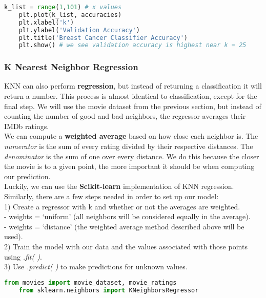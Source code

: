 \documentclass[11pt, a4paper]{article}
\begin{document}
\begin{spacing}{1.1}
\begin{lstlisting}[language=Python]
	k_list = range(1,101) # x values
	plt.plot(k_list, accuracies)
	plt.xlabel('k')
	plt.ylabel('Validation Accuracy')
	plt.title('Breast Cancer Classifier Accuracy')
	plt.show() # we see validation accuracy is highest near k = 25	\end{lstlisting} \newpage

	\subsubsection{K Nearest Neighbor Regression}
	KNN can also perform \textbf{regression}, but instead of returning a classification it will return a number. This process is almost identical to classification, except for the final step. We will use the movie dataset from the previous section, but instead of counting the number of good and bad neighbors, the regressor averages their IMDb ratings. \vspace*{2mm} \\
	We can compute a \textbf{weighted average} based on how close each neighbor is. The \textit{numerator} is the sum of every rating divided by their respective distances. The \textit{denominator} is the sum of one over every distance. We do this because the closer the movie is to a given point, the more important it should be when computing our prediction. \vspace*{2mm} \\
	Luckily, we can use the \textbf{Scikit-learn} implementation of KNN regression. Similarly, there are a few steps needed in order to set up our model: \\
	\hspace*{3mm} 1) Create a regressor with k and whether or not the averages are weighted. \\
	\hspace*{7mm} - weights = `uniform' (all neighbors will be considered equally in the average). \\
	\hspace*{7mm} - weights = `distance' (the weighted average method described above will be used). \\
	\hspace*{3mm} 2) Train the model  with our data and the values associated with those points using \textit{.fit( )}. \\
	\hspace*{3mm} 3) Use \textit{.predict( )} to make predictions for unknown values.	
	\begin{lstlisting}[language=Python]
	from movies import movie_dataset, movie_ratings
	from sklearn.neighbors import KNeighborsRegressor
	

\end{lstlisting}
\end{spacing}
\end{document}

